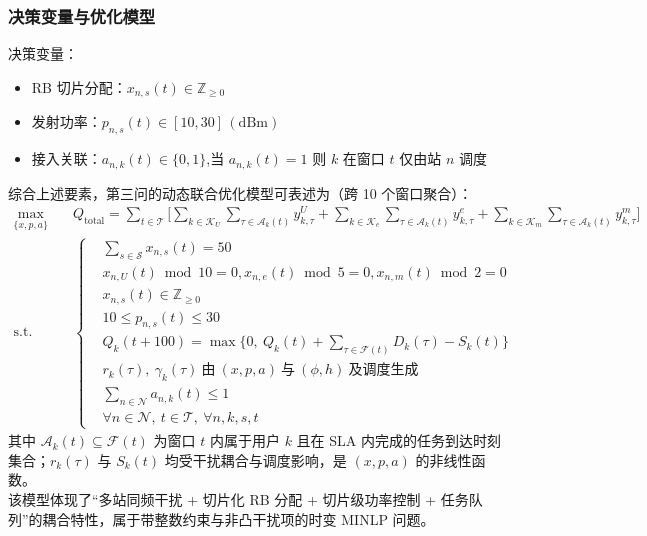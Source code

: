 \subsubsection{决策变量与优化模型}

决策变量：
\begin{itemize}
  \item RB 切片分配：$x_{n,s}(t)\in\mathbb{Z}_{\ge 0}$
  \item 发射功率：$p_{n,s}(t)\in[10,30]\,\mathrm{(dBm)}$
  \item 接入关联：$a_{n,k}(t)\in\{0,1\}$,当 $a_{n,k}(t)=1$ 则 $k$ 在窗口 $t$ 仅由站 $n$ 调度
\end{itemize}

综合上述要素，第三问的动态联合优化模型可表述为（跨 10 个窗口聚合）：
\begin{equation}
\begin{aligned}
\max_{\{x,p,a\}}\quad & Q_{\text{total}}=\sum_{t\in\mathcal{T}}\Bigg[\sum_{k\in\mathcal{K}_U}\sum_{\tau\in\mathcal{A}_k(t)} y^{U}_{k,\tau}+\sum_{k\in\mathcal{K}_e}\sum_{\tau\in\mathcal{A}_k(t)} y^{e}_{k,\tau}+\sum_{k\in\mathcal{K}_m}\sum_{\tau\in\mathcal{A}_k(t)} y^{m}_{k,\tau}\Bigg] \\
\text{s.t.}\quad & 
\left\{
\begin{aligned}
&\sum_{s\in\mathcal{S}} x_{n,s}(t)=50 \\
&x_{n,U}(t)\bmod 10=0 ,x_{n,e}(t)\bmod 5=0 ,x_{n,m}(t)\bmod 2=0 \\
&x_{n,s}(t)\in\mathbb{Z}_{\ge 0} \\
&10\le p_{n,s}(t)\le 30\\
&Q_k(t+100)=\max\Big\{0,\ Q_k(t)+\sum_{\tau\in\mathcal{F}(t)} D_k(\tau)-S_k(t)\Big\} \\
&r_k(\tau),\ \gamma_k(\tau)\ \text{由}\ (x,p,a)\ \text{与}\ (\phi,h)\ \text{及调度生成} \\
&\sum_{n\in\mathcal{N}} a_{n,k}(t)\le 1 \\
&\forall n\in\mathcal{N},\ t\in\mathcal{T},\ \forall n,k,s,t
\end{aligned}
\right.
\end{aligned}
\end{equation}
其中 $\mathcal{A}_k(t)\subseteq\mathcal{F}(t)$ 为窗口 $t$ 内属于用户 $k$ 且在 SLA 内完成的任务到达时刻集合；$r_k(\tau)$ 与 $S_k(t)$ 均受干扰耦合与调度影响，是 $(x,p,a)$ 的非线性函数。\\
该模型体现了“多站同频干扰 + 切片化 RB 分配 + 切片级功率控制 + 任务队列”的耦合特性，属于带整数约束与非凸干扰项的时变 MINLP 问题。

